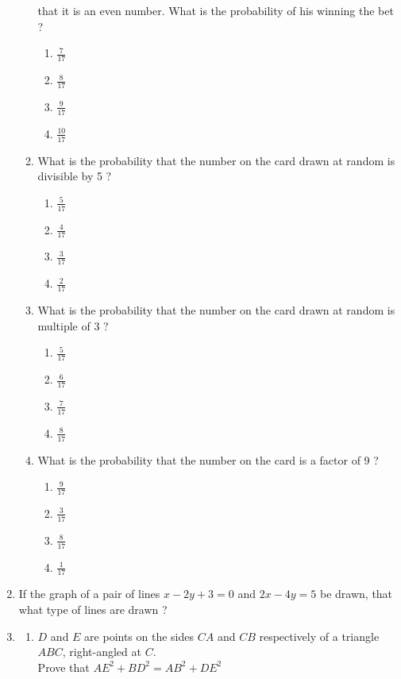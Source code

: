 \documentclass{article}
\begin{document}
\begin{enumerate}
\begin{enumerate}
				that it is an even number. What is the probability of his winning the bet ? 
				\begin{enumerate}
					\item $ \frac{7}{17} $
					\item $ \frac{8}{17} $
					\item $ \frac{9}{17} $
					\item $ \frac{10}{17} $
				\end{enumerate}
			\item What is the probability that the number on the card drawn at random is divisible 
				by 5 ?
				\begin{enumerate}
					\item $ \frac{5}{17} $
					\item $ \frac{4}{17} $
					\item $ \frac{3}{17} $
					\item $ \frac{2}{17} $
				\end{enumerate}
			\item What is the probability that the number on the card drawn at random is multiple 
				of 3 ? 
				\begin{enumerate}
					\item $ \frac{5}{17} $
					\item $ \frac{6}{17} $
					\item $ \frac{7}{17} $
					\item $ \frac{8}{17} $
				\end{enumerate}
			\item What is the probability that the number on the card is a factor of 9 ?
				\begin{enumerate}
					\item $ \frac{9}{17} $
					\item $ \frac{3}{17} $
					\item $ \frac{8}{17} $
					\item $ \frac{1}{17} $
				\end{enumerate}
		\end{enumerate}
	\item If the graph of a pair of lines $ x - 2y + 3 = 0 $ and $ 2x - 4y = 5 $ be drawn, that what type of 
		lines are drawn ? 
	\item
		\begin{enumerate}
			\item $ D $ and $ E $ are points on the sides $ CA $ and $ CB $ respectively of 
			a triangle $ ABC $, right-angled at $ C $. \\
		        Prove that $ AE^2 + BD^2 =AB^2 + DE^2 $ 


\end{enumerate}
\end{enumerate}
\end{document}
